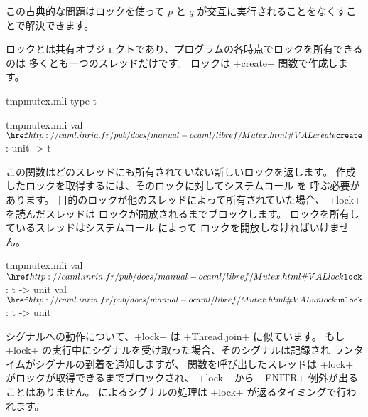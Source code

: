 この古典的な問題はロックを使って $p$ と $q$ が交互に実行されることをなくすことで解決できます。

ロックとは共有オブジェクトであり、プログラムの各時点でロックを所有できるのは
多くとも一つのスレッドだけです。
ロックは \ml+create+ 関数で作成します。
%
\begin{codefile}{tmpmutex.mli}
  type t
\end{codefile}
%
\begin{listingcodefile}{tmpmutex.mli}
val $\libvalue{Mutex}{create}$ : unit -> t
\end{listingcodefile}
%
この関数はどのスレッドにも所有されていない新しいロックを返します。
作成したロックを取得するには、そのロックに対してシステムコール  を
呼ぶ必要があります。
目的のロックが他のスレッドによって所有されていた場合、 \ml+lock+ を読んだスレッドは
ロックが開放されるまでブロックします。
ロックを所有しているスレッドはシステムコール  によって
ロックを開放しなければいけません。
%
\begin{listingcodefile}{tmpmutex.mli}
val $\libvalue{Mutex}{lock}$ : t -> unit
val $\libvalue{Mutex}{unlock}$ : t -> unit
\end{listingcodefile}
%
シグナルへの動作について、\ml+lock+ は \ml+Thread.join+ に似ています。
もし \ml+lock+ の実行中にシグナルを受け取った場合、そのシグナルは記録され
\ocaml ランタイムがシグナルの到着を通知しますが、
関数を呼び出したスレッドは \ml+lock+ がロックが取得できるまでブロックされ、
\ml+lock+ から \ml+ENITR+ 例外が出ることはありません。
\ocaml によるシグナルの処理は \ml+lock+ が返るタイミングで行われます。

